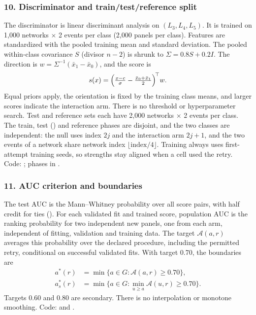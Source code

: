 \subsubsection*{10. Discriminator and train/test/reference split}
The discriminator is linear discriminant analysis on $(L_3,L_4,L_5)$. It is trained on 1,000 networks $\times$ 2 events per class (2,000 panels per class). Features are standardized with the pooled training mean and standard deviation. The pooled within-class covariance $S$ (divisor $n-2$) is shrunk to $\Sigma=0.8S+0.2I$. The direction is $w=\Sigma^{-1}(\bar x_1-\bar x_0)$, and the score is
\begin{equation*}
s(x)=\Bigl(\tfrac{x-c}{\sigma}-\tfrac{\bar x_0+\bar x_1}2\Bigr)^{\!\top} w.
\end{equation*}
Equal priors apply, the orientation is fixed by the training class means, and larger scores indicate the interaction arm. There is no threshold or hyperparameter search. Test and reference sets each have 2,000 networks $\times$ 2 events per class. The train, test () and reference phases are disjoint, and the two classes are independent: the null uses index $2j$ and the interaction arm $2j+1$, and the two events of a network share network index $\lfloor\text{index}/4\rfloor$. Training always uses first-attempt training seeds, so strengths stay aligned when a cell used the retry. Code: ; phases in .

\subsubsection*{11. AUC criterion and boundaries}
The test AUC is the Mann--Whitney probability over all score pairs, with half credit for ties (). For each validated fit and trained score, population AUC is the ranking probability for two independent new panels, one from each arm, independent of fitting, validation and training data. The target $\mathcal A(a,r)$ averages this probability over the declared procedure, including the permitted retry, conditional on successful validated fits. With target 0.70, the boundaries are
\begin{align*}
a^*(r)&=\min\{a\in G:\mathcal A(a,r)\ge0.70\},\\
a^*_s(r)&=\min\{a\in G:\min_{u\ge a}\mathcal A(u,r)\ge0.70\}.
\end{align*}
Targets 0.60 and 0.80 are secondary. There is no interpolation or monotone smoothing. Code:  and .

